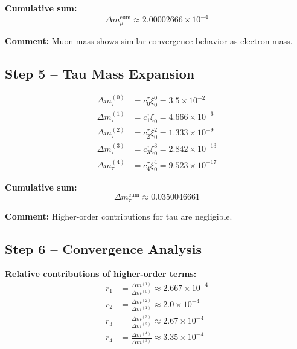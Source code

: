 \documentclass[12pt,a4paper]{article}
\begin{document}
\textbf{Cumulative sum:}
\begin{equation}
	\Delta m_\mu^\text{cum} \approx 2.00002666 \times 10^{-4}
\end{equation}

\textbf{Comment:} Muon mass shows similar convergence behavior as electron mass.

\subsection{Step 5 – Tau Mass Expansion}

\begin{align}
	\Delta m_\tau^{(0)} &= c_0^\tau \xi_0^0 = 3.5 \times 10^{-2} \\
	\Delta m_\tau^{(1)} &= c_1^\tau \xi_0 = 4.666 \times 10^{-6} \\
	\Delta m_\tau^{(2)} &= c_2^\tau \xi_0^2 = 1.333 \times 10^{-9} \\
	\Delta m_\tau^{(3)} &= c_3^\tau \xi_0^3 = 2.842 \times 10^{-13} \\
	\Delta m_\tau^{(4)} &= c_4^\tau \xi_0^4 = 9.523 \times 10^{-17}
\end{align}

\textbf{Cumulative sum:}
\begin{equation}
	\Delta m_\tau^\text{cum} \approx 0.0350046661
\end{equation}

\textbf{Comment:} Higher-order contributions for tau are negligible.

\subsection{Step 6 – Convergence Analysis}

\textbf{Relative contributions of higher-order terms:}
\begin{align}
	r_1 &= \frac{\Delta m^{(1)}}{\Delta m^{(0)}} \approx 2.667 \times 10^{-4} \\
	r_2 &= \frac{\Delta m^{(2)}}{\Delta m^{(1)}} \approx 2.0 \times 10^{-4} \\
	r_3 &= \frac{\Delta m^{(3)}}{\Delta m^{(2)}} \approx 2.67 \times 10^{-4} \\
	r_4 &= \frac{\Delta m^{(4)}}{\Delta m^{(3)}} \approx 3.35 \times 10^{-4}
\end{align}
\end{document}
